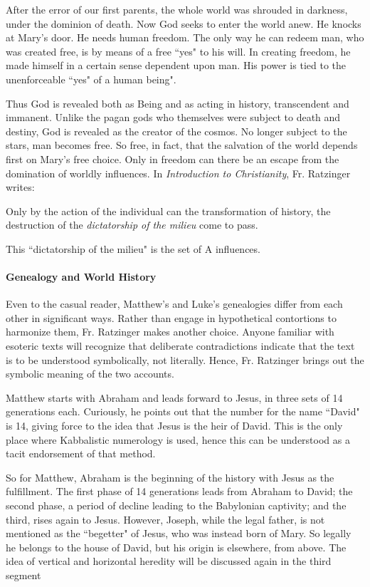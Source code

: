 \begin{quotex}
After the error of our first parents, the whole world was shrouded in darkness, under the dominion of death. Now God seeks to enter the world anew. He knocks at Mary's door. He needs human freedom. The only way he can redeem man, who was created free, is by means of a free ``yes" to his will. In creating freedom, he made himself in a certain sense dependent upon man. His power is tied to the unenforceable ``yes" of a human being". 

\end{quotex}
Thus God is revealed both as Being and as acting in history, transcendent and immanent. Unlike the pagan gods who themselves were subject to death and destiny, God is revealed as the creator of the cosmos. No longer subject to the stars, man becomes free. So free, in fact, that the salvation of the world depends first on Mary's free choice. Only in freedom can there be an escape from the domination of worldly influences. In \emph{Introduction to Christianity}, Fr. Ratzinger writes:

\begin{quotex}
Only by the action of the individual can the transformation of history, the destruction of the \emph{dictatorship of the milieu} come to pass. 

\end{quotex}
This ``dictatorship of the milieu" is the set of A influences.

\paragraph{Genealogy and World History}
Even to the casual reader, Matthew's and Luke's genealogies differ from each other in significant ways. Rather than engage in hypothetical contortions to harmonize them, Fr. Ratzinger makes another choice. Anyone familiar with esoteric texts will recognize that deliberate contradictions indicate that the text is to be understood symbolically, not literally. Hence, Fr. Ratzinger brings out the symbolic meaning of the two accounts.

Matthew starts with Abraham and leads forward to Jesus, in three sets of 14 generations each. Curiously, he points out that the number for the name ``David" is 14, giving force to the idea that Jesus is the heir of David. This is the only place where Kabbalistic numerology is used, hence this can be understood as a tacit endorsement of that method.

So for Matthew, Abraham is the beginning of the history with Jesus as the fulfillment. The first phase of 14 generations leads from Abraham to David; the second phase, a period of decline leading to the Babylonian captivity; and the third, rises again to Jesus. However, Joseph, while the legal father, is not mentioned as the ``begetter" of Jesus, who was instead born of Mary. So legally he belongs to the house of David, but his origin is elsewhere, from above. The idea of vertical and horizontal heredity will be discussed again in the third segment

